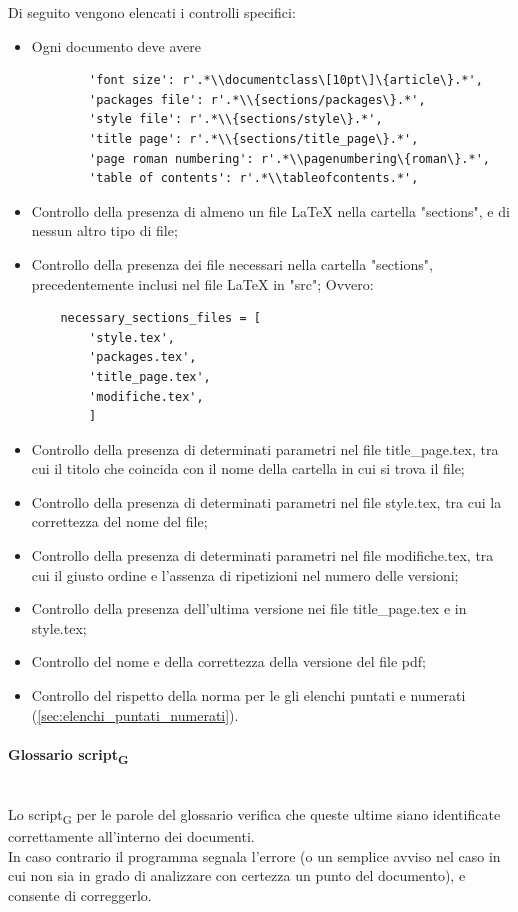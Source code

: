 Di seguito vengono elencati i controlli specifici:
\begin{itemize}
	\item Ogni documento deve avere 
	\begin{lstlisting}
		'font size': r'.*\\documentclass\[10pt\]\{article\}.*',
		'packages file': r'.*\\{sections/packages\}.*',
		'style file': r'.*\\{sections/style\}.*',
		'title page': r'.*\\{sections/title_page\}.*',
		'page roman numbering': r'.*\\pagenumbering\{roman\}.*',
		'table of contents': r'.*\\tableofcontents.*',
		\end{lstlisting}
		\item Controllo della presenza di almeno un file LaTeX nella cartella "sections", e di nessun altro tipo di file;
		\item Controllo della presenza dei file necessari nella cartella "sections", precedentemente inclusi nel file LaTeX in "src";
	Ovvero:
	\begin{lstlisting}
	necessary_sections_files = [
		'style.tex',
		'packages.tex',
		'title_page.tex',
		'modifiche.tex',
		]
	\end{lstlisting}
	\item Controllo della presenza di determinati parametri nel file title\_page.tex, tra cui il titolo che coincida con il nome della cartella in cui si trova il file;
	\item Controllo della presenza di determinati parametri nel file style.tex, tra cui la correttezza del nome del file;
	\item Controllo della presenza di determinati parametri nel file modifiche.tex, tra cui il giusto ordine e l'assenza di ripetizioni nel numero delle versioni;
	\item Controllo della presenza dell'ultima versione nei file title\_page.tex e in style.tex;
	\item Controllo del nome e della correttezza della versione del file pdf;
	\item Controllo del rispetto della norma per le gli elenchi puntati e numerati (\ref{sec:elenchi_puntati_numerati}).
\end{itemize}

\paragraph{Glossario script\textsubscript{G}}\mbox{}\\
Lo script\textsubscript{G} per le parole del glossario verifica che queste ultime siano identificate correttamente all'interno dei documenti.\\
In caso contrario il programma segnala l'errore (o un semplice avviso nel caso in cui non sia in grado di analizzare con certezza un punto del documento), e consente di correggerlo.\\


